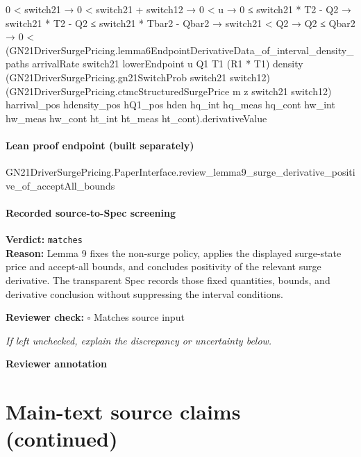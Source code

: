 \documentclass[10pt]{article}
\newcommand{\reviewerbox}{%
  \par\noindent\fbox{\parbox{0.96\linewidth}{\rule{0pt}{0.38in}}}\par
}
\newcommand{\reviewmatch}[1]{%
  \par\noindent\textbf{Reviewer check:} $\square$\; #1\par
  \noindent\emph{If left unchecked, explain the discrepancy or uncertainty below.}\par
}
\begin{document}
\begin{ReviewVerbatim}
                    0 < switch21 →
                      0 < switch21 + switch12 →
                        0 < u →
                          0 ≤ switch21 * T2 - Q2 →
                            switch21 * T2 - Q2 ≤ switch21 * Tbar2 - Qbar2 →
                              switch21 < Q2 →
                                Q2 ≤ Qbar2 →
                                  0 <
                                    (GN21DriverSurgePricing.lemma6EndpointDerivativeData_of_interval_density_paths
                                        arrivalRate switch21 lowerEndpoint u Q1 T1 (R1 * T1) density
                                        (GN21DriverSurgePricing.gn21SwitchProb switch21 switch12)
                                        (GN21DriverSurgePricing.ctmcStructuredSurgePrice m z switch21 switch12)
                                        harrival_pos hdensity_pos hQ1_pos hden hq_int hq_meas hq_cont hw_int hw_meas
                                        hw_cont ht_int ht_meas ht_cont).derivativeValue
\end{ReviewVerbatim}

\paragraph{Lean proof endpoint (built separately)}\begin{ReviewVerbatim}
GN21DriverSurgePricing.PaperInterface.review_lemma9_surge_derivative_positive_of_acceptAll_bounds
\end{ReviewVerbatim}

\paragraph{Recorded source-to-Spec screening}
\textbf{Verdict:} \texttt{matches}
\\
\textbf{Reason:} Lemma 9 fixes the non-surge policy, applies the displayed surge-state price and accept-all bounds, and concludes positivity of the relevant surge derivative. The transparent Spec records those fixed quantities, bounds, and derivative conclusion without suppressing the interval conditions.
\reviewmatch{Matches source input}
\noindent\textbf{Reviewer annotation}\par
\reviewerbox
\clearpage
\hypertarget{source-claim-a66252366d7621fe}{}
\hypertarget{source-section-c08c7eca66416a2f}{}
\section*{Main-text source claims (continued)}
\end{document}
